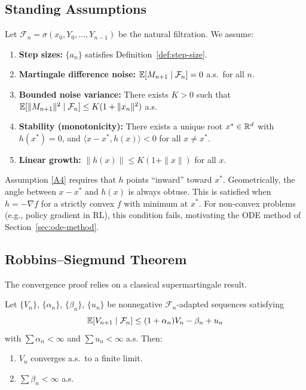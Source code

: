 \documentclass[11pt,a4paper]{article}
\begin{document}
\subsection{Standing Assumptions}

\begin{definition}
\label{def:rm-assumptions}
Let $\mathcal{F}_n = \sigma(x_0, Y_0, \ldots, Y_{n-1})$ be the
natural filtration. We assume:
\begin{enumerate}[label=(A\arabic*)]
  \item \label{A1} \textbf{Step sizes:} $\{a_n\}$ satisfies
    Definition~\ref{def:step-size}.
  \item \label{A2} \textbf{Martingale difference noise:}
    $\mathbb{E}[M_{n+1} \mid \mathcal{F}_n] = 0$ a.s.\ for all $n$.
  \item \label{A3} \textbf{Bounded noise variance:} There exists
    $K > 0$ such that
    $\mathbb{E}[\|M_{n+1}\|^2 \mid \mathcal{F}_n] \leq K(1 + \|x_n\|^2)$ a.s.
  \item \label{A4} \textbf{Stability (monotonicity):} There exists a
    unique root $x^* \in \mathbb{R}^d$ with $h(x^*) = 0$, and
    $\langle x - x^*, h(x) \rangle < 0$ for all $x \neq x^*$.
  \item \label{A5} \textbf{Linear growth:}
    $\|h(x)\| \leq K(1 + \|x\|)$ for all $x$.
\end{enumerate}
\end{definition}

\begin{remark}
Assumption \ref{A4} requires that $h$ points ``inward'' toward $x^*$.
Geometrically, the angle between $x - x^*$ and $h(x)$ is always
obtuse. This is satisfied when $h = -\nabla f$ for a strictly convex
$f$ with minimum at $x^*$. For non-convex problems (e.g., policy
gradient in RL), this condition fails, motivating the ODE method of
Section~\ref{sec:ode-method}.
\end{remark}

\subsection{Robbins--Siegmund Theorem}

The convergence proof relies on a classical supermartingale result.

\begin{theorem}
\label{thm:robbins-siegmund}
Let $\{V_n\}$, $\{\alpha_n\}$, $\{\beta_n\}$, $\{u_n\}$ be
nonnegative $\mathcal{F}_n$-adapted sequences satisfying
\[
  \mathbb{E}[V_{n+1} \mid \mathcal{F}_n]
    \leq (1 + \alpha_n) V_n - \beta_n + u_n
\]
with $\sum \alpha_n < \infty$ and $\sum u_n < \infty$ a.s. Then:
\begin{enumerate}[label=(\roman*)]
  \item $V_n$ converges a.s.\ to a finite limit.
  \item $\sum \beta_n < \infty$ a.s.
\end{enumerate}
\end{theorem}
\end{document}
